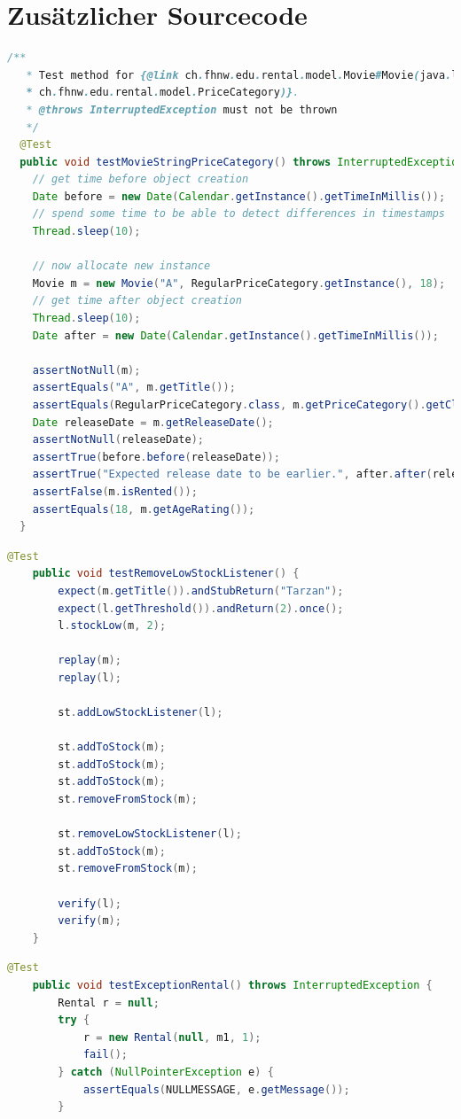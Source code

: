 \documentclass[a4paper,10pt]{article}
\begin{document}
\section{Zus\"{a}tzlicher Sourcecode}
\begin{lstlisting}[language=Java,caption=JUnit-Test mit Javadoc, style=MyJavaStyle]
  /**
   * Test method for {@link ch.fhnw.edu.rental.model.Movie#Movie(java.lang.String, 
   * ch.fhnw.edu.rental.model.PriceCategory)}.
   * @throws InterruptedException must not be thrown
   */
  @Test
  public void testMovieStringPriceCategory() throws InterruptedException {
    // get time before object creation
    Date before = new Date(Calendar.getInstance().getTimeInMillis());
    // spend some time to be able to detect differences in timestamps
    Thread.sleep(10);

    // now allocate new instance
    Movie m = new Movie("A", RegularPriceCategory.getInstance(), 18);
    // get time after object creation
    Thread.sleep(10);
    Date after = new Date(Calendar.getInstance().getTimeInMillis());
    
    assertNotNull(m);
    assertEquals("A", m.getTitle());
    assertEquals(RegularPriceCategory.class, m.getPriceCategory().getClass());
    Date releaseDate = m.getReleaseDate();
    assertNotNull(releaseDate);
    assertTrue(before.before(releaseDate));
    assertTrue("Expected release date to be earlier.", after.after(releaseDate));
    assertFalse(m.isRented());
    assertEquals(18, m.getAgeRating());
  }
\end{lstlisting}
\begin{lstlisting}[language=Java,caption=Junit-Test mit Mock-Testing, style=MyJavaStyle]
    @Test
    public void testRemoveLowStockListener() {
        expect(m.getTitle()).andStubReturn("Tarzan");
        expect(l.getThreshold()).andReturn(2).once();
        l.stockLow(m, 2);
        
        replay(m);
        replay(l);
        
        st.addLowStockListener(l);
        
        st.addToStock(m);
        st.addToStock(m);
        st.addToStock(m);
        st.removeFromStock(m);
        
        st.removeLowStockListener(l);
        st.addToStock(m);
        st.removeFromStock(m);
        
        verify(l);
        verify(m);
    }
\end{lstlisting}

\begin{lstlisting}[language=Java,caption=Junit-Test mit korrekter Verwendung von fail(), style=MyJavaStyle]
    @Test
    public void testExceptionRental() throws InterruptedException {
        Rental r = null;
        try {
            r = new Rental(null, m1, 1);
            fail();
        } catch (NullPointerException e) {
            assertEquals(NULLMESSAGE, e.getMessage());
        }
\end{lstlisting}
\end{document}
